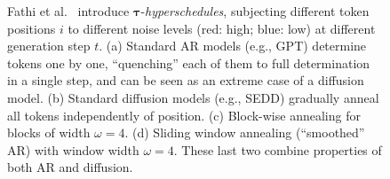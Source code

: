 \begin{figure}[h]
    \centering
    \hfill
    \hfill
    \hfill
    \caption[shorttitle]{%
        Fathi et al.~\cite{fathi_unifying_2025} introduce $\boldsymbol{\tau}$-\emph{hyperschedules}, subjecting different token positions $i$ to different noise levels (red: high; blue: low) at different generation step $t$. 
        (a) Standard AR models (e.g., GPT) determine tokens one by one, ``quenching'' each of them to full determination in a single step, and can be seen as an extreme case of a diffusion model. 
        (b) Standard diffusion models (e.g., SEDD) gradually anneal all tokens independently of position. 
        (c) Block-wise annealing for blocks of width $\omega=4$. 
        (d) Sliding window annealing (``smoothed'' AR) with window width $\omega=4$. These last two combine properties of both AR and diffusion.%
    }
    \label{fig:four_subfigs}
\end{figure}

